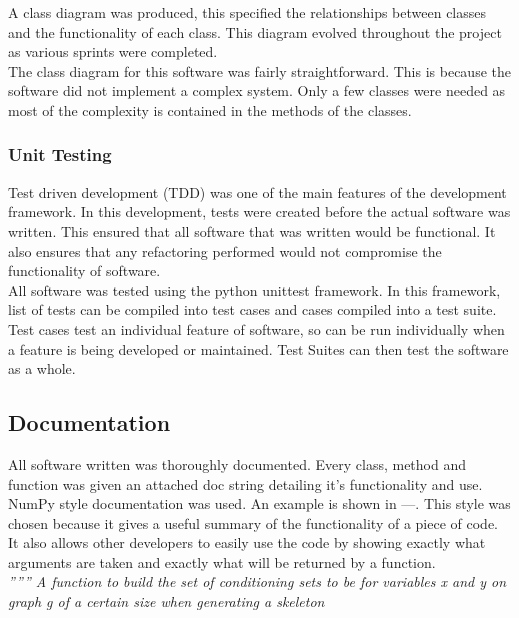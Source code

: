 \documentclass{article}
\begin{document}
A class diagram was produced, this specified the relationships between classes and the functionality of each class. This diagram evolved throughout the project as various sprints were completed.\\

The class diagram for this software was fairly straightforward. This is because the software did not implement a complex system. Only a few classes were needed as most of the complexity is contained in the methods of the classes.

\subsubsection{Unit Testing}
Test driven development (TDD) was one of the main features of the development framework. In this development, tests were created before the actual software was written. This ensured that all software that was written would be functional. It also ensures that any refactoring performed would not compromise the functionality of software.\\

All software was tested using the python unittest framework. In this framework, list of tests can be compiled into test cases and cases compiled into a test suite. Test cases test an individual feature of software, so can be run individually when a feature is being developed or maintained. Test Suites can then test the software as a whole.\\

\subsection{Documentation}
All software written was thoroughly documented. Every class, method and function was given an attached doc string detailing it's functionality and use.\\

NumPy style documentation was used. An example is shown in ---. This style was chosen because it gives a useful summary of the functionality of a piece of code. It also allows other developers to easily use the code by showing exactly what arguments are taken and exactly what will be returned by a function.\\

\textit{ '''''' A  function to build the set of conditioning sets to be for variables x and y
	on graph g of a certain size when generating a skeleton\\}
	
\end{document}
